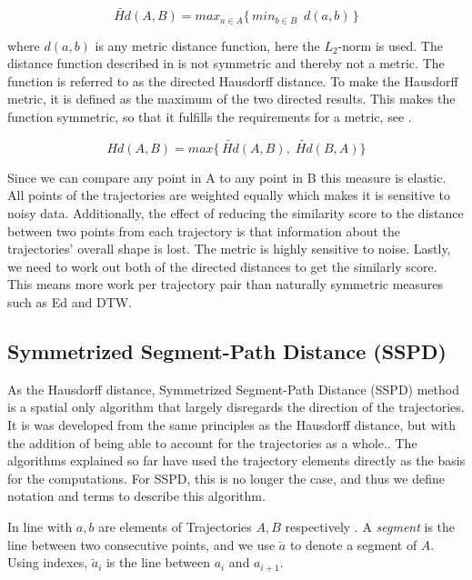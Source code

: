 \begin{equation}
\label{eq:Hd-directed}
\widetilde{Hd}(A, B) = max_{a\in A}\big\{ \, min_{b\in B } \enspace d(a, b)\,\big\}
\end{equation}

where $d(a, b)$ is any metric distance function, here the $L_2$-norm is used. 
The distance function described in  is not symmetric and thereby not a metric\cite{14-EfficientAlgorithm}. The function is referred to as the directed Hausdorff distance. 
To make the Hausdorff metric, it is defined as the maximum  of the two directed results. 
This makes the function symmetric, so that it fulfills the requirements for a metric, see .

\begin{equation}
\label{eq:Hd-metric}
Hd(A, B) = max\big\{ \,\widetilde{Hd}(A, B), \;\widetilde{Hd}(B, A)\big\}
\end{equation}

Since we can compare any point in A to any point in B this measure is elastic. 
All points of the trajectories are weighted equally which makes it is sensitive to noisy data. 
Additionally, the effect of reducing the similarity score to the distance between two points from each trajectory is that information about the trajectories' overall shape is lost. 
The metric is highly sensitive to noise\cite{51-HausdorffDistance}. 
Lastly, we need to work out both of the directed distances to get the similarly score. This means more work per trajectory pair than naturally symmetric measures such as Ed and DTW.  


\subsection{Symmetrized Segment-Path Distance (SSPD)}
As the  Hausdorff distance, Symmetrized Segment-Path Distance (SSPD) method is a spatial only algorithm that largely disregards the direction of the trajectories.
It is was developed from the same principles as the Hausdorff distance, but with the addition of being able to account for  the trajectories as a whole.\cite{43-TrajectoryDistance, 50-ReviewPerspective}. 
The algorithms explained so far have used the trajectory elements directly as the basis for the computations. For SSPD, this is no longer the case, and thus we define notation and terms to describe this algorithm.  

 In line with    $a, b$ are elements of Trajectories $A, B$ respectively . 
 A \textit{segment} is the line between two consecutive points, and we use $\breve{a}$ to denote a segment of $A$. Using indexes,  $\breve{a}_i$ is the line between $a_i$ and $a_{i+1}$. 

